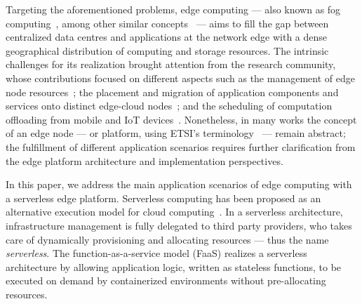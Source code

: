 \documentclass[letterpaper, 10 pt, conference]{ieeeconf}  %
\begin{document}
Targeting the aforementioned problems, edge computing --- also known as fog computing~\cite{Bonomi:2012}, among other similar concepts~\cite{Satyanarayanan:2009,Taleb:2013,ETSI:MEC:2016:03} --- aims to fill the gap between centralized data centres and applications at the network edge with a dense geographical distribution of computing and storage resources. The intrinsic challenges for its realization brought attention from the research community, whose contributions focused on different aspects such as the management of edge node resources~\cite{N.Wang:2017}; the placement and migration of application components and services onto distinct edge-cloud nodes~\cite{Wang:2015a,Wang:2017,Machen:2018}; and the scheduling of computation offloading from mobile and IoT devices~\cite{Liu:2016, OrsiniBL16}. Nonetheless, in many works the concept of an edge node --- or platform, using ETSI's terminology~\cite{ETSI:MEC:2016:03} --- remain abstract; the fulfillment of different application scenarios requires further clarification from the edge platform architecture and implementation perspectives.










In this paper, we address the main application scenarios of edge computing with a serverless edge platform. 
Serverless computing has been proposed as an alternative execution model for cloud computing~\cite{}. In a serverless architecture, infrastructure management is fully delegated to third party providers, who takes care of dynamically provisioning and allocating resources --- thus the name \textit{serverless}. The function-as-a-service model (FaaS) realizes a serverless architecture by allowing application logic, written as stateless functions, to be executed on demand by containerized environments without pre-allocating resources. 
\end{document}
